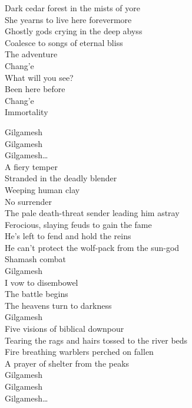 Dark cedar forest in the mists of yore\\
She yearns to live here forevermore\\
Ghostly gods crying in the deep abyss\\
Coalesce to songs of eternal bliss\\

The adventure\\
Chang'e\\
What will you see?\\
Been here before\\
Chang'e\\
Immortality\\



Gilgamesh\\
Gilgamesh\\
Gilgamesh…\\

A fiery temper\\
Stranded in the deadly blender\\
Weeping human clay\\
No surrender\\
The pale death-threat sender leading him astray\\
Ferocious, slaying feuds to gain the fame\\
He's left to fend and hold the reins\\
He can't protect the wolf-pack from the sun-god\\
Shamash combat\\

Gilgamesh\\
I vow to disembowel\\
The battle begins\\
The heavens turn to darkness\\
Gilgamesh\\

Five visions of biblical downpour\\
Tearing the rags and hairs tossed to the river beds\\
Fire breathing warblers perched on fallen\\
A prayer of shelter from the peaks\\

Gilgamesh\\
Gilgamesh\\
Gilgamesh…\\

